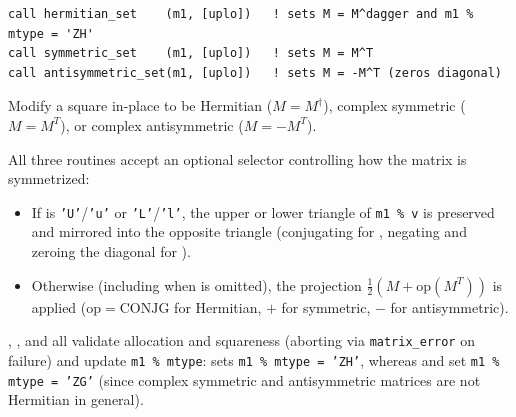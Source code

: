 
\lstset{language=[95]Fortran}
\begin{lstlisting}
call hermitian_set    (m1, [uplo])   ! sets M = M^dagger and m1 % mtype = 'ZH'
call symmetric_set    (m1, [uplo])   ! sets M = M^T
call antisymmetric_set(m1, [uplo])   ! sets M = -M^T (zeros diagonal)
\end{lstlisting}

Modify a square  in-place to be Hermitian ($M = M^\dagger$), complex symmetric ($M = M^T$), or complex antisymmetric ($M = -M^T$).

All three routines accept an optional  selector controlling how the matrix is symmetrized:
\begin{itemize}
  \item If  is \texttt{'U'}/\texttt{'u'} or \texttt{'L'}/\texttt{'l'}, the upper or lower triangle of \texttt{m1 \% v} is preserved and mirrored into the opposite triangle (conjugating for , negating and zeroing the diagonal for ).
  \item Otherwise (including when  is omitted), the projection $\frac{1}{2}(M + \mathrm{op}(M^T))$ is applied ($\mathrm{op} = \mathrm{CONJG}$ for Hermitian, $+$ for symmetric, $-$ for antisymmetric).
\end{itemize}
, , and  all validate allocation and squareness (aborting via \texttt{matrix\_error} on failure) and update \texttt{m1 \% mtype}:  sets \texttt{m1 \% mtype = 'ZH'}, whereas  and  set \texttt{m1 \% mtype = 'ZG'} (since complex symmetric and antisymmetric matrices are not Hermitian in general).

